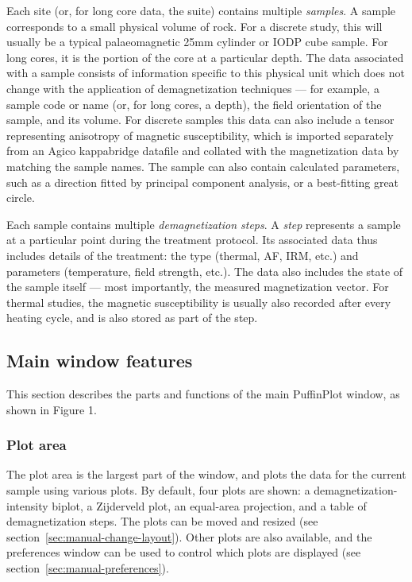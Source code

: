 \documentclass[a4paper]{article}
\begin{document}
Each site (or, for long core data, the suite) contains multiple
\emph{samples}. A sample corresponds to a small physical volume of rock.
For a discrete study, this will usually be a typical palaeomagnetic 25mm
cylinder or IODP cube sample. For long cores, it is the portion of the
core at a particular depth. The data associated with a sample consists
of information specific to this physical unit which does not change with
the application of demagnetization techniques --- for example, a sample
code or name (or, for long cores, a depth), the field orientation of the
sample, and its volume. For discrete samples this data can also include
a tensor representing anisotropy of magnetic susceptibility, which is
imported separately from an Agico kappabridge datafile and collated with
the magnetization data by matching the sample names. The sample can also
contain calculated parameters, such as a direction fitted by principal
component analysis, or a best-fitting great circle.

Each sample contains multiple \emph{demagnetization steps}. A
\emph{step} represents a sample at a particular point during the
treatment protocol. Its associated data thus includes details of the
treatment: the type (thermal, AF, IRM, etc.) and parameters
(temperature, field strength, etc.). The data also includes the state of
the sample itself --- most importantly, the measured magnetization
vector. For thermal studies, the magnetic susceptibility is usually also
recorded after every heating cycle, and is also stored as part of the
step.

\subsection{Main window features}

This section describes the parts and functions of the main PuffinPlot
window, as shown in Figure 1.

\subsubsection{Plot area}

The plot area is the largest part of the window, and plots the data for the
current sample using various plots. By default, four plots are shown: a
demagnetization-intensity biplot, a Zijderveld plot, an equal-area
projection, and a table of demagnetization steps. The plots can be moved and
resized (see section~\ref{sec:manual-change-layout}). Other plots are also
available, and the preferences window can be used to control which plots are
displayed (see section~\ref{sec:manual-preferences}).
\end{document}

